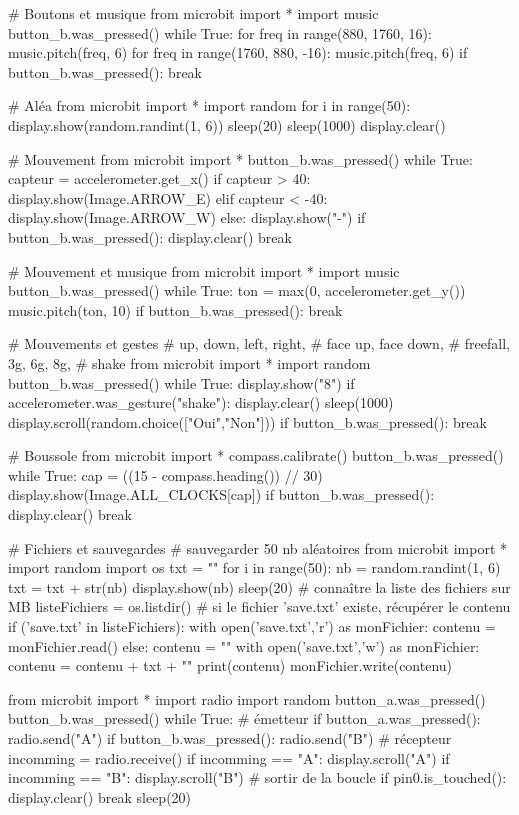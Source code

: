 # Boutons et musique
from microbit import *
import music
button_b.was_pressed()
while True:
    for freq in range(880, 1760, 16):
        music.pitch(freq, 6)
    for freq in range(1760, 880, -16):
        music.pitch(freq, 6)
    if button_b.was_pressed():
        break


# Aléa
from microbit import *
import random
for i in range(50):
    display.show(random.randint(1, 6))
    sleep(20)
sleep(1000)
display.clear()


# Mouvement
from microbit import *
button_b.was_pressed()
while True:
    capteur = accelerometer.get_x()
    if capteur > 40:
        display.show(Image.ARROW_E)
    elif capteur < -40:
        display.show(Image.ARROW_W)
    else:
        display.show("-")
    if button_b.was_pressed():
        display.clear()
        break


# Mouvement et musique
from microbit import *
import music
button_b.was_pressed()
while True:
    ton = max(0, accelerometer.get_y())
    music.pitch(ton, 10)
    if button_b.was_pressed():
        break


# Mouvements et gestes
# up, down, left, right,
# face up, face down,
# freefall, 3g, 6g, 8g,
# shake
from microbit import *
import random
button_b.was_pressed()
while True:
    display.show("8")
    if accelerometer.was_gesture("shake"):
        display.clear()
        sleep(1000)
        display.scroll(random.choice(["Oui","Non"]))
    if button_b.was_pressed():
        break


# Boussole
from microbit import *
compass.calibrate()
button_b.was_pressed()
while True:
    cap = ((15 - compass.heading()) // 30) %
    display.show(Image.ALL_CLOCKS[cap])
    if button_b.was_pressed():
        display.clear()
        break


# Fichiers et sauvegardes
# sauvegarder 50 nb aléatoires
from microbit import *
import random
import os
txt = ""
for i in range(50):
    nb = random.randint(1, 6)
    txt = txt + str(nb)
    display.show(nb)
    sleep(20)
# connaître la liste des fichiers sur MB
listeFichiers = os.listdir()
# si le fichier 'save.txt' existe, récupérer le contenu
if ('save.txt' in listeFichiers):
    with open('save.txt','r') as monFichier:
        contenu = monFichier.read()
else:
    contenu = ""
with open('save.txt','w') as monFichier:
    contenu = contenu + txt + "\n"
    print(contenu)
    monFichier.write(contenu)


from microbit import *
import radio
import random
button_a.was_pressed()
button_b.was_pressed()
while True:
    # émetteur
    if button_a.was_pressed():
        radio.send("A")
    if button_b.was_pressed():
        radio.send("B")
    # récepteur
    incomming = radio.receive()
    if incomming == "A":
        display.scroll("A")
    if incomming == "B":
        display.scroll("B")
    # sortir de la boucle
    if pin0.is_touched():
        display.clear()
        break
    sleep(20)


